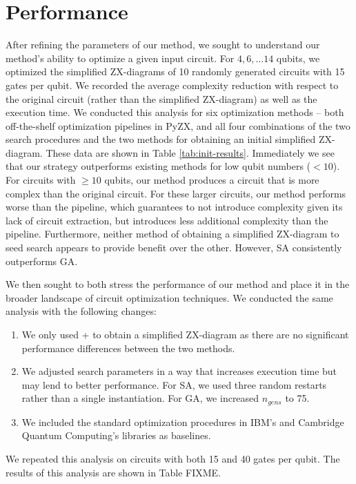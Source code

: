 \section{Performance}

After refining the parameters of our method, we sought to understand our method's ability to optimize a given input circuit.
For $4, 6, \dots 14$ qubits, we optimized the simplified ZX-diagrams of 10 randomly generated circuits with 15 gates per qubit.
We recorded the average complexity reduction with respect to the original circuit (rather than the simplified ZX-diagram) as well as the execution time.
We conducted this analysis for six optimization methods -- both off-the-shelf optimization pipelines in PyZX, and all four combinations of the two search procedures and the two methods for obtaining an initial simplified ZX-diagram.
These data are shown in Table \ref{tab:init-results}.
Immediately we see that our strategy outperforms existing methods for low qubit numbers ($<10$).
For circuits with $\geq 10$ qubits, our method produces a circuit that is more complex than the original circuit.
For these larger circuits, our method performs worse than the  pipeline, which guarantees to not introduce complexity given its lack of circuit extraction, but introduces less additional complexity than the  pipeline.
Furthermore, neither method of obtaining a simplified ZX-diagram to seed search appears to provide benefit over the other.
However, SA consistently outperforms GA.

We then sought to both stress the performance of our method and place it in the broader landscape of circuit optimization techniques.
We conducted the same analysis with the following changes:
\begin{enumerate}
\item
  We only used  +  to obtain a simplified ZX-diagram as there are no significant performance differences between the two methods.
\item
  We adjusted search parameters in a way that increases execution time but may lend to better performance.
  For SA, we used three random restarts rather than a single instantiation.
  For GA, we increased $n_{gens}$ to 75.
\item
  We included the standard optimization procedures in IBM's  and Cambridge Quantum Computing's  libraries as baselines.
\end{enumerate}
We repeated this analysis on circuits with both 15 and 40 gates per qubit.
The results of this analysis are shown in Table FIXME.



